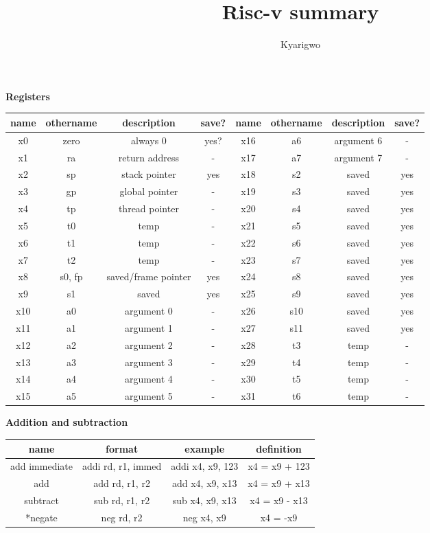 \documentclass{article}
\author{Kyarigwo}
\title{Risc-v summary}
\begin{document}
\begin{center}

  \textbf{Registers}

  \begin{tabular}{|c|c|c|c||c|c|c|c|}
    \hline
    name & othername & description & save? &  name & othername & description & save? \\
    \hline
    x0 & zero & always 0 & yes? & x16 & a6  & argument 6 & - \\
    x1 & ra  & return address  & - & x17 & a7  & argument 7  & - \\
    x2 & sp  & stack pointer  & yes & x18 & s2  & saved  & yes \\
    x3 & gp  & global pointer  & - & x19 & s3  & saved  & yes \\
    x4 & tp  & thread pointer  & - & x20 & s4  & saved  & yes \\
    x5 & t0  & temp  & - & x21 & s5  & saved  & yes \\
    x6 & t1  & temp  & - & x22 & s6  & saved  & yes \\
    x7 & t2  & temp  & - & x23 & s7  & saved  & yes \\
    x8 & s0, fp & saved/frame pointer & yes & x24 & s8  & saved  & yes \\
    x9 & s1  & saved  & yes & x25 & s9  & saved  & yes \\
    x10 & a0  & argument 0  & - & x26 & s10  & saved  & yes \\
    x11 & a1  & argument 1  & - & x27 & s11  & saved  & yes \\
    x12 & a2  & argument 2  & - & x28 & t3  & temp  & - \\
    x13 & a3  & argument 3  & - & x29 & t4  & temp  & - \\
    x14 & a4  & argument 4  & - & x30 & t5  & temp  & - \\
    x15 & a5  & argument 5  & - & x31 & t6  & temp  & - \\
  \hline
  \end{tabular}


  \textbf{Addition and subtraction}

  \begin{tabular}{|c|c|c|c|}
    \hline
    name          & format             & example          & definition    \\
    \hline
    add immediate & addi rd, r1, immed & addi x4, x9, 123 & x4 = x9 + 123 \\
    add           & add  rd, r1, r2    & add x4, x9, x13  & x4 = x9 + x13 \\
    subtract      & sub  rd, r1, r2    & sub x4, x9, x13  & x4 = x9 - x13 \\
    *negate        & neg rd, r2         & neg x4, x9       & x4 = -x9      \\
    \hline
  \end{tabular}


\end{center}
\end{document}
